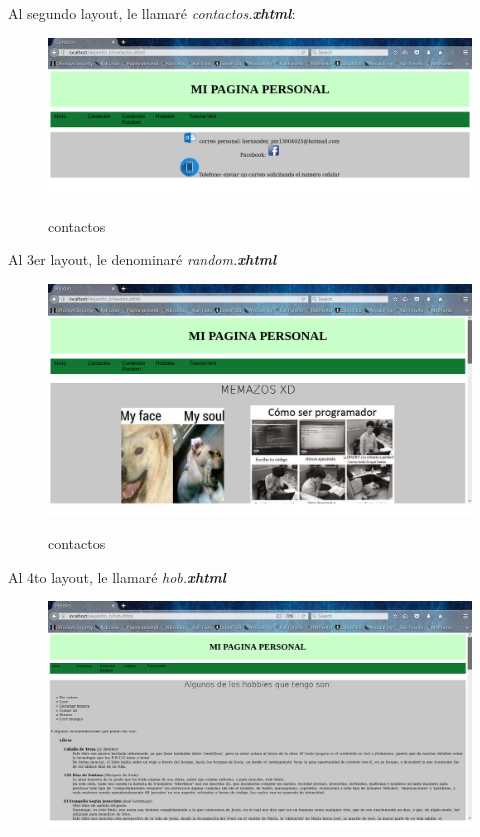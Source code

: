 \documentclass[12pt,letterpaper, spanish]{article}
\begin{document}
\begin{flushleft}
Al segundo layout, le llamar\'e {\em contactos.}{\bf {\em xhtml}}:
\newpage
\begin{center}
\begin{figure}[h!]
\includegraphics[scale=0.3]{./imgs/contactos.png}
\vspace{-15mm}
{\em{\caption {contactos}}}\label{figura 4}
\end{figure}
\end{center}
\vspace{-1cm}
Al 3er layout, le denominar\'e {\em random.}{\bf {\em xhtml}}
\begin{center}
\begin{figure}[h!]
\includegraphics[scale=0.3]{./imgs/random.png}
\vspace{-10mm}
{\em{\caption {contactos}}}\label{figura 5}
\end{figure}
\end{center}
\vspace{-1cm}
Al 4to layout, le llamar\'e {\em hob.}{\bf {\em xhtml}}
\newpage
\vspace{-15mm}
\begin{center}
\begin{figure}[h!]
\includegraphics[scale=0.3]{./imgs/hob.png}

\end{figure}
\end{center}
\end{flushleft}
\end{document}
